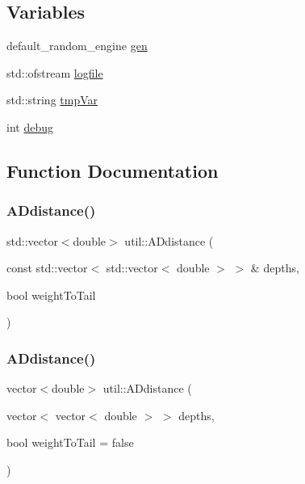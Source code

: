 \subsection*{Variables}
\begin{DoxyCompactItemize}
\item 
default\+\_\+random\+\_\+engine \hyperlink{namespaceutil_ab30b96cc3fcd37942fb7f9f8a2e1898d}{gen}
\item 
std\+::ofstream \hyperlink{namespaceutil_af123fd54ef9ea843e69a69dfd986f59e}{logfile}
\item 
std\+::string \hyperlink{namespaceutil_a4839a6e82a650d17fe48a7ab99640835}{tmp\+Var}
\item 
int \hyperlink{namespaceutil_aeda4e5339822ac6c9fb3f1991c126bfb}{debug}
\end{DoxyCompactItemize}


\subsection{Function Documentation}
\mbox{\label{namespaceutil_a08fbdd196c73244d0e2130c3a70d2f2b}} 
\subsubsection{\texorpdfstring{A\+Ddistance()}{ADdistance()}\hspace{0.1cm}{\footnotesize\ttfamily [1/2]}}
{\footnotesize\ttfamily std\+::vector$<$double$>$ util\+::\+A\+Ddistance (\begin{DoxyParamCaption}\item[{const std\+::vector$<$ std\+::vector$<$ double $>$ $>$ \&}]{depths,  }\item[{bool}]{weight\+To\+Tail }\end{DoxyParamCaption})}

\mbox{\label{namespaceutil_a422abe670c555eeeded897e3d9861b77}} 
\subsubsection{\texorpdfstring{A\+Ddistance()}{ADdistance()}\hspace{0.1cm}{\footnotesize\ttfamily [2/2]}}
{\footnotesize\ttfamily vector$<$double$>$ util\+::\+A\+Ddistance (\begin{DoxyParamCaption}\item[{vector$<$ vector$<$ double $>$ $>$}]{depths,  }\item[{bool}]{weight\+To\+Tail = {\ttfamily false} }\end{DoxyParamCaption})}

